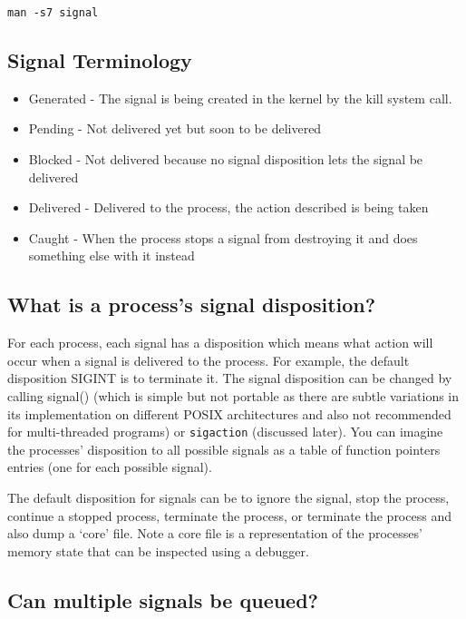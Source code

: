 \begin{verbatim}
man -s7 signal
\end{verbatim}

\subsection{Signal Terminology}\label{signal-terminology}

\begin{itemize}
\tightlist
\item
  Generated - The signal is being created in the kernel by the kill
  system call.
\item
  Pending - Not delivered yet but soon to be delivered
\item
  Blocked - Not delivered because no signal disposition lets the signal
  be delivered
\item
  Delivered - Delivered to the process, the action described is being
  taken
\item
  Caught - When the process stops a signal from destroying it and does
  something else with it instead
\end{itemize}

\subsection{What is a process's signal
disposition?}\label{what-is-a-processs-signal-disposition}

For each process, each signal has a disposition which means what action
will occur when a signal is delivered to the process. For example, the
default disposition SIGINT is to terminate it. The signal disposition
can be changed by calling signal() (which is simple but not portable as
there are subtle variations in its implementation on different POSIX
architectures and also not recommended for multi-threaded programs) or
\texttt{sigaction} (discussed later). You can imagine the processes'
disposition to all possible signals as a table of function pointers
entries (one for each possible signal).

The default disposition for signals can be to ignore the signal, stop
the process, continue a stopped process, terminate the process, or
terminate the process and also dump a `core' file. Note a core file is a
representation of the processes' memory state that can be inspected
using a debugger.

\subsection{Can multiple signals be
queued?}\label{can-multiple-signals-be-queued}

